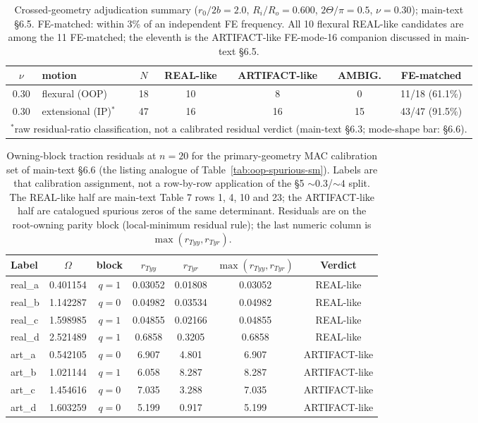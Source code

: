 \documentclass[11pt]{article}
\begin{document}
\begin{table}[!htbp]\centering\small
\caption{Crossed-geometry adjudication summary ($r_0/2b=2.0$,
$R_i/R_o=0.600$, $2\Theta/\pi=0.5$, $\nu=0.30$); main-text \S6.5.
FE-matched: within 3\% of an independent FE frequency. All 10 flexural
REAL-like candidates are among the 11 FE-matched;
the eleventh is the ARTIFACT-like FE-mode-16 companion discussed in
main-text \S6.5.}
\label{tab:r200a50}
\begin{tabular}{clccccc}
\toprule $\nu$ & motion & $N$ & REAL-like & ARTIFACT-like & AMBIG. & FE-matched\\ \midrule
0.30 & flexural (OOP)    & 18 & 10 & 8 & 0  & 11/18 (61.1\%)\\
0.30 & extensional (IP)$^\ast$  & 47 & 16 & 16 & 15 & 43/47 (91.5\%)\\
\bottomrule
\multicolumn{7}{l}{\footnotesize $^\ast$raw residual-ratio classification, not a calibrated residual verdict (main-text \S6.3; mode-shape bar: \S6.6).}\\
\end{tabular}
\end{table}

\begin{table}[!htbp]\centering\small
\caption{Owning-block traction residuals at $n{=}20$ for the
primary-geometry MAC calibration set of main-text \S6.6 (the listing
analogue of Table~\ref{tab:oop-spurious-sm}). Labels are that calibration assignment,
not a row-by-row application of the \S5 ${\sim}0.3$/${\sim}4$ split.
The REAL-like half are main-text Table 7 rows 1, 4, 10 and 23; the ARTIFACT-like
half are catalogued spurious zeros of the same determinant. Residuals
are on the root-owning parity block (local-minimum residual rule);
the last numeric column is $\max(r_{Tyy},r_{Tyr})$.}
\label{tab:ip-spurious}
\begin{tabular}{lcccccc}
\toprule Label & $\Omega$ & block & $r_{Tyy}$ & $r_{Tyr}$ & $\max(r_{Tyy},r_{Tyr})$ & Verdict\\ \midrule
real\_a & 0.401154 & $q{=}1$ & 0.03052 & 0.01808 & 0.03052 & REAL-like\\
real\_b & 1.142287 & $q{=}0$ & 0.04982 & 0.03534 & 0.04982 & REAL-like\\
real\_c & 1.598985 & $q{=}1$ & 0.04855 & 0.02166 & 0.04855 & REAL-like\\
real\_d & 2.521489 & $q{=}1$ & 0.6858 & 0.3205 & 0.6858 & REAL-like\\
art\_a & 0.542105 & $q{=}0$ & 6.907 & 4.801 & 6.907 & ARTIFACT-like\\
art\_b & 1.021144 & $q{=}1$ & 6.058 & 8.287 & 8.287 & ARTIFACT-like\\
art\_c & 1.454616 & $q{=}0$ & 7.035 & 3.288 & 7.035 & ARTIFACT-like\\
art\_d & 1.603259 & $q{=}0$ & 5.199 & 0.917 & 5.199 & ARTIFACT-like\\
\bottomrule
\end{tabular}
\end{table}
\end{document}
